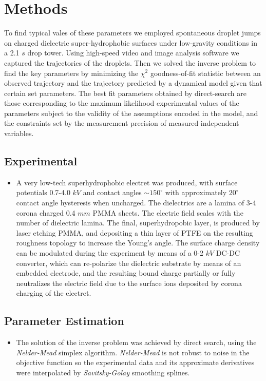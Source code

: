 \documentclass[a4paper, 12pt]{article}
\begin{document}
\section{Methods}
To find typical vales of these parameters we employed spontaneous droplet jumps on charged dielectric super-hydrophobic surfaces under low-gravity conditions in a 2.1 $s$ drop tower. Using high-speed video and image analysis software we captured the trajectories of the droplets. Then we solved the inverse problem to find the key parameters by minimizing the $\chi^2$ goodness-of-fit statistic between an observed trajectory and the trajectory predicted by a dynamical model given that certain set parameters. The best fit parameters obtained by direct-search are those corresponding to the maximum likelihood experimental values of the parameters subject to the validity of the assumptions encoded in the model, and the constraints set by the measurement precision of measured independent variables.

\subsection{Experimental}
\begin{itemize}
\item A very low-tech superhydrophobic electret was produced, with surface potentials 0.7-4.0 $kV$ and contact angles $\sim 150^{\circ}$ with approximately $20^{\circ}$ contact angle hysteresis when uncharged. The dielectrics are a lamina of 3-4 corona charged 0.4 $mm$ PMMA sheets. The electric field scales with the number of dielectric lamina. The final, superhydropobic layer, is produced by laser etching PMMA, and depositing a thin layer of PTFE on the resulting roughness topology to increase the Young's angle. The surface charge density can be modulated during the experiment by means of a 0-2 $kV$ DC-DC converter, which can re-polarize the dielectric substrate by means of an embedded electrode, and the resulting bound charge partially or fully neutralizes the electric field due to the surface ions deposited by corona charging of the electret.
\end{itemize}   

\subsection{Parameter Estimation}
\begin{itemize}
\item The solution of the inverse problem  was achieved by direct search, using the \emph{Nelder-Mead} simplex algorithm. \emph{Nelder-Mead} is not robust to noise in the objective function so the experimental data and its approximate derivatives were interpolated by \emph{Savitsky-Golay} smoothing splines.
\end{itemize}
\end{document}
